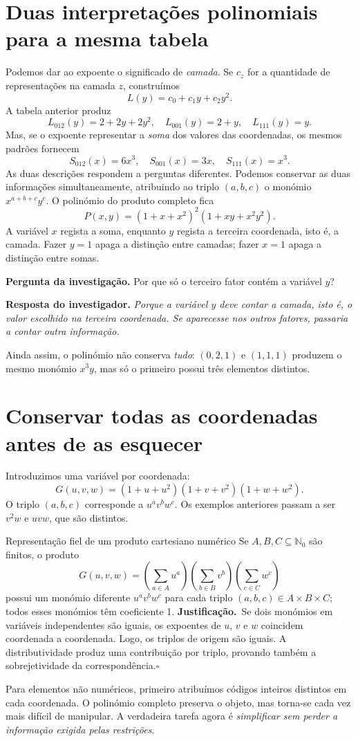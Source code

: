 \documentclass[11pt,a4paper,oneside]{book}
\newcommand{\Pergunta}[1]{\begin{perguntabox}\textbf{Pergunta da investigação.} #1\end{perguntabox}}
\newcommand{\Resposta}[1]{\textcolor{verdeescuro}{\textbf{Resposta do investigador.}} \emph{#1}\par}
\newcommand{\prova}{\textbf{Justificação.}\ }
\newcommand{\fimprova}{\hfill$\square$}
\newcommand{\Nzero}{\mathbb{N}_0}
\begin{document}
\section{Duas interpretações polinomiais para a mesma tabela}
Podemos dar ao expoente o significado de \emph{camada}. Se $c_z$ for a quantidade de representações na camada $z$, construímos
\[L(y)=c_0+c_1y+c_2y^2.\]
A tabela anterior produz
\[
L_{012}(y)=2+2y+2y^2,\quad L_{001}(y)=2+y,\quad L_{111}(y)=y.
\]
Mas, se o expoente representar a \emph{soma} dos valores das coordenadas, os mesmos padrões fornecem
\[
S_{012}(x)=6x^3,\quad S_{001}(x)=3x,\quad S_{111}(x)=x^3.
\]
As duas descrições respondem a perguntas diferentes. Podemos conservar as duas informações simultaneamente, atribuindo ao triplo $(a,b,c)$ o monómio $x^{a+b+c}y^c$. O polinómio do produto completo fica
\[
P(x,y)=(1+x+x^2)^2(1+xy+x^2y^2).
\]
A variável $x$ regista a soma, enquanto $y$ regista a terceira coordenada, isto é, a camada. Fazer $y=1$ apaga a distinção entre camadas; fazer $x=1$ apaga a distinção entre somas.
\Pergunta{Por que só o terceiro fator contém a variável $y$?}
\Resposta{Porque a variável $y$ deve contar a camada, isto é, o valor escolhido na terceira coordenada. Se aparecesse nos outros fatores, passaria a contar outra informação.}
Ainda assim, o polinómio não conserva \emph{tudo}: $(0,2,1)$ e $(1,1,1)$ produzem o mesmo monómio $x^3y$, mas só o primeiro possui três elementos distintos.
\section{Conservar todas as coordenadas antes de as esquecer}
Introduzimos uma variável por coordenada:
\[
G(u,v,w)=(1+u+u^2)(1+v+v^2)(1+w+w^2).
\]
O triplo $(a,b,c)$ corresponde a $u^av^bw^c$. Os exemplos anteriores passam a ser $v^2w$ e $uvw$, que são distintos.
\begin{teoremabox}{Representação fiel de um produto cartesiano numérico}
Se $A,B,C\subseteq\Nzero$ são finitos, o produto
\[
G(u,v,w)=\left(\sum_{a\in A}u^a\right)
\left(\sum_{b\in B}v^b\right)
\left(\sum_{c\in C}w^c\right)
\]
possui um monómio diferente $u^av^bw^c$ para cada triplo $(a,b,c)\in A\times B\times C$; todos esses monómios têm coeficiente 1.
\prova Se dois monómios em variáveis independentes são iguais, os expoentes de $u$, $v$ e $w$ coincidem coordenada a coordenada. Logo, os triplos de origem são iguais. A distributividade produz uma contribuição por triplo, provando também a sobrejetividade da correspondência.\fimprova
\end{teoremabox}
Para elementos não numéricos, primeiro atribuímos códigos inteiros distintos em cada coordenada. O polinómio completo preserva o objeto, mas torna-se cada vez mais difícil de manipular. A verdadeira tarefa agora é \emph{simplificar sem perder a informação exigida pelas restrições}.
\end{document}
